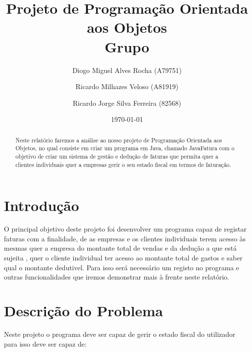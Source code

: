 \documentclass[a4paper]{article}
\title{Projeto de Programação Orientada aos Objetos\\Grupo }
\author{Diogo Miguel Alves Rocha (A79751)\and Ricardo Milhazes Veloso (A81919) \and Ricardo Jorge Silva Ferreira (82568)}
\date{\today}
\begin{document}
\maketitle

\begin{abstract}
 
 Neste relatório faremos a análise ao nosso projeto de Programação Orientada aos Objetos, no qual consiste em criar um programa em Java, chamado JavaFatura com o objetivo de criar um sistema de gestão e dedução de faturas que permita quer a clientes individuais quer a empresas gerir o seu estado fiscal em termos de faturação.

 \end{abstract}

\tableofcontents

\section{Introdução}
\label{sec:intro} 

O principal objetivo deste projeto foi desenvolver um programa capaz de registar faturas com a finalidade, de as empresas e os clientes individuais terem acesso às mesmas quer a empresa do montante total de vendas e da dedução a que está sujeita , quer o cliente individual ter acesso ao montante total de gastos e saber qual o montante dedutivel. Para isso será necessário um registo no programa e outras funcionalidades que iremos demonstrar mais à frente neste relatório.


\section{Descrição do Problema}
\label{sec:descricao do problema}
Neste projeto o programa deve ser capaz de gerir o estado fiscal do utilizador para isso deve ser capaz de:
\end{document}
